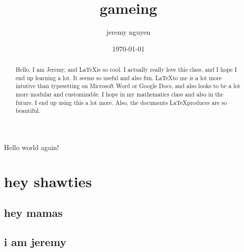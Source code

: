 \documentclass[letterpaper,notitlepage,11pt]{article}
\begin{document}
\title{gameing}
\author{jeremy nguyen}
\date{\today}
\maketitle
\begin{abstract}
	Hello, I am Jeremy, and \LaTeX is so cool. I actually really love this class,
	and I hope I end up learning a lot. It seems so useful and also fun. \LaTeX to
	me is a lot more intutive than typesetting on Microsoft Word or Google Docs,
	and also looks to be a lot more modular and customizable. I hope in my
	mathematics class and also in the future, I end up using this a lot more. Also,
	the documents \LaTeX produces are so beautiful.
\end{abstract}

Hello {\color{red} world} again!

\section{hey shawties}
\subsection{hey mamas}

\newpage

\subsection{i am jeremy}
\end{document}
